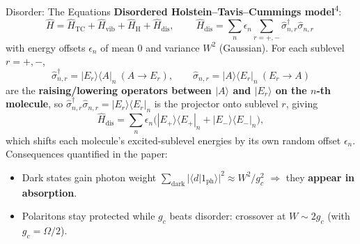 \documentclass[aspectratio=169,11pt]{beamer}
\newcommand{\refmark}[1]{\textsuperscript{\color{srcgray}#1}}
\begin{document}
\begin{frame}{Disorder: The Equations}
  \small
  \textbf{Disordered Holstein--Tavis--Cummings model}\refmark{4}:
  \[
    \hat H=\hat H_{\mathrm{TC}}+\hat H_{\mathrm{vib}}+\hat H_{\mathrm{H}}+\hat H_{\mathrm{dis}},
    \qquad
    \boxed{\ \hat H_{\mathrm{dis}}=\sum_n \epsilon_n\!\!\sum_{r=+,-}\hat\sigma_{n,r}^\dagger\hat\sigma_{n,r}\ }
  \]
  with energy offsets $\epsilon_n$ of mean $0$ and variance $W^2$ (Gaussian). For
  each sublevel $r=+,-$,
  \[
    \hat\sigma_{n,r}^\dagger = |E_r\rangle\langle A|_n\ (A\!\to\!E_r), \qquad
    \hat\sigma_{n,r} = |A\rangle\langle E_r|_n\ (E_r\!\to\!A)
  \]
  are the \textbf{raising/lowering operators between $|A\rangle$ and $|E_r\rangle$
  on the $n$-th molecule}, so $\hat\sigma_{n,r}^\dagger\hat\sigma_{n,r}=|E_r\rangle\langle E_r|_n$
  is the projector onto sublevel $r$, giving
  \[
    \hat H_{\mathrm{dis}}=\sum_n \epsilon_n\big(|E_+\rangle\langle E_+|_n+|E_-\rangle\langle E_-|_n\big),
  \]
  which shifts each molecule's excited-sublevel energies by its own random
  offset $\epsilon_n$. Consequences quantified in the paper:
  \begin{itemize}\small
    \item Dark states gain photon weight
          $\sum_{\mathrm{dark}}|\langle d|1_{\mathrm{ph}}\rangle|^2\approx W^2/g_c^2$
          $\Rightarrow$ they \textbf{appear in absorption}.
    \item Polaritons stay protected while $g_c$ beats disorder: crossover at
          $W\sim 2g_c$ (with $g_c=\Omega/2$).
  \end{itemize}
\end{frame}

\end{document}
